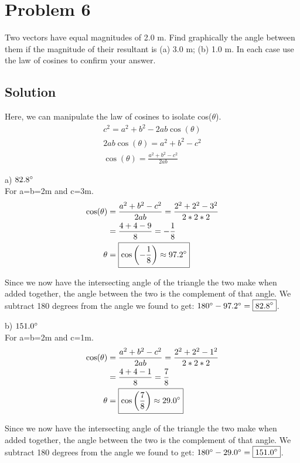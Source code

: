 \documentclass[12pt]{article}
\begin{document}
\pagebreak
\section*{Problem 6}
Two vectors have equal magnitudes of 2.0 m. Find graphically the angle between them if the magnitude of their resultant is (a) 3.0 m; (b) 1.0 m. In each case use the law of cosines to confirm your answer.

\subsection*{Solution}

Here, we can manipulate the law of cosines to isolate cos($\theta$).
\begin{eqnarray*}
    c^2 = a^2 + b^2 - 2ab\cos(\theta)\\
    2ab\cos(\theta) = a^2 + b^2 - c^2\\
    \cos(\theta) = \frac{a^2 + b^2 - c^2}{2ab}
\end{eqnarray*}

a) $82.8\degree$\\
For a=b=2m and c=3m.
\begin{align*}
    \cos(\theta) &= \frac{a^2 + b^2 - c^2}{2ab} = \frac{2^2 + 2^2 - 3^2}{2*2*2}\\
                 &= \frac{4+4-9}{8} = -\frac{1}{8}\\
    \theta &= \boxed{ \cos\left(-\frac{1}{8}\right) \approx 97.2\degree }
\end{align*}

Since we now have the intersecting angle of the triangle the two make when added together, the angle between the two is the complement of that angle. We subtract 180 degrees from the angle we found to get: $180\degree - 97.2\degree = \boxed{82.8\degree}$.
\pagebreak

b) $151.0\degree$\\
For a=b=2m and c=1m.
\begin{align*}
    \cos(\theta) &= \frac{a^2 + b^2 - c^2}{2ab} = \frac{2^2 + 2^2 - 1^2}{2*2*2}\\
                 &= \frac{4+4-1}{8} = \frac{7}{8}\\
    \theta &= \boxed{ \cos\left(\frac{7}{8}\right) \approx 29.0\degree }
\end{align*}

Since we now have the intersecting angle of the triangle the two make when added together, the angle between the two is the complement of that angle. We subtract 180 degrees from the angle we found to get: $180\degree - 29.0\degree = \boxed{151.0\degree}$.
\end{document}
